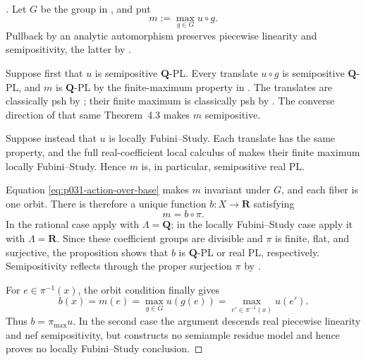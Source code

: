 
\begin{proof}[]
Let $G$ be the group in
, and put
\begin{equation}
\label{eq:p031-orbit-symmetrization}
                         m:=\max_{g\in G}u\circ g.
\end{equation}
Pullback by an analytic automorphism preserves piecewise linearity and
semipositivity, the latter by
\cite[Proposition~7.6\textup{(1')}]{GJR26}.

Suppose first that $u$ is semipositive $\mathbf Q$-PL.  Every translate
$u\circ g$ is semipositive $\mathbf Q$-PL, and $m$ is $\mathbf Q$-PL by
the finite-maximum property in \cite[\S5.2\textup{(7)}]{GJR26}.  The
translates are classically psh by
\cite[Theorem~4.3]{GR25Classical}; their finite maximum is classically psh
by \cite[Proposition~4.2\textup{(3)}]{GR25Classical}.  The converse
direction of that same Theorem~4.3 makes $m$ semipositive.

Suppose instead that $u$ is locally Fubini--Study.  Each translate has the
same property, and the full real-coefficient local calculus of
\cite[\S7.9]{GJR26} makes their finite maximum locally Fubini--Study.
Hence $m$ is, in particular, semipositive real PL.

Equation \eqref{eq:p031-action-over-base} makes $m$ invariant under $G$,
and each fiber is one orbit.  There is therefore a unique function
$b:X\to\mathbf R$ satisfying
\begin{equation}
\label{eq:p031-orbit-symmetrization-descends}
                         m=b\circ\pi.
\end{equation}
In the rational case apply \cite[Proposition~5.11]{GJR26} with
$\Lambda=\mathbf Q$; in the locally Fubini--Study case apply it with
$\Lambda=\mathbf R$.  Since these coefficient groups are divisible and
$\pi$ is finite, flat, and surjective, the proposition shows that $b$ is
$\mathbf Q$-PL or real PL, respectively.  Semipositivity reflects through
the proper surjection $\pi$ by
\cite[Proposition~7.6\textup{(1')}]{GJR26}.

For $e\in\pi^{-1}(x)$, the orbit condition finally gives
\[
 b(x)=m(e)=\max_{g\in G}u(g(e))
              =\max_{e'\in\pi^{-1}(x)}u(e').
\]
Thus $b=\pi_{\max}u$.  In the second case the argument descends real
piecewise linearity and nef semipositivity, but constructs no semiample
residue model and hence proves no locally Fubini--Study conclusion.
\end{proof}

